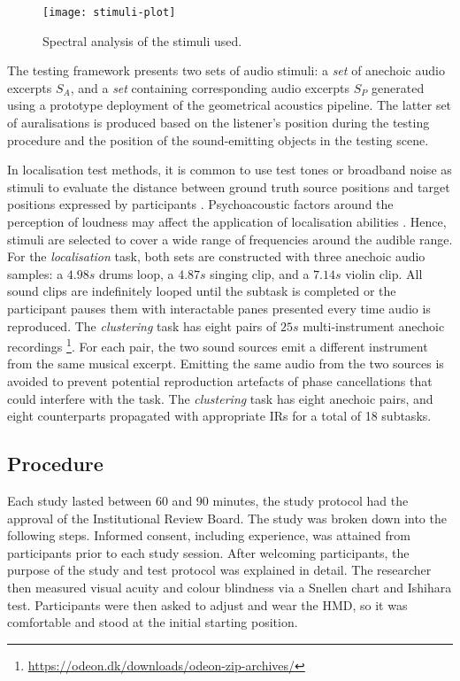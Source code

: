 \begin{figure}[htbp]
    \centering
    \texttt{[image: stimuli-plot]}
    \caption{Spectral analysis of the stimuli used.}
    \label{fig:stimuli}
\end{figure}
The testing framework presents two sets of audio stimuli: a \emph{set} of anechoic audio excerpts $S_A$, and a \emph{set} containing corresponding audio excerpts $S_P$ generated using a prototype deployment of the geometrical acoustics pipeline. The latter set of auralisations is produced based on the listener's position during the testing procedure and the position of the sound-emitting objects in the testing scene. \par
In localisation test methods, it is common to use test tones or broadband noise as stimuli to evaluate the distance between ground truth source positions and target positions expressed by participants \citep{bertet2013investigation, kashino1998adaptation}. Psychoacoustic factors around the perception of loudness may affect the application of localisation abilities \citep{blauert1997spatial}. Hence, stimuli are selected to cover a wide range of frequencies around the audible range.
For the \emph{localisation} task, both sets are constructed with three anechoic audio samples: a $4.98s$ drums loop, a $4.87s$ singing clip, and a $7.14s$ violin clip. All sound clips are indefinitely looped until the subtask is completed or the participant pauses them with interactable panes presented every time audio is reproduced.
The \emph{clustering} task has eight pairs of $25s$ multi-instrument anechoic recordings \footnote{\url{https://odeon.dk/downloads/odeon-zip-archives/}}. For each pair, the two sound sources emit a different instrument from the same musical excerpt. Emitting the same audio from the two sources is avoided to prevent potential reproduction artefacts of phase cancellations that could interfere with the task. The \emph{clustering} task has eight anechoic pairs, and eight counterparts propagated with appropriate IRs for a total of 18 subtasks.

\subsection{Procedure}\label{sec:psy-procedure}
Each study lasted between 60 and 90 minutes, the study protocol had the approval of the Institutional Review Board. The study was broken down into the following steps. Informed consent, including experience, was attained from participants prior to each study session. After welcoming participants, the purpose of the study and test protocol was explained in detail. The researcher then measured visual acuity and colour blindness via a Snellen chart and Ishihara test. Participants were then asked to adjust and wear the HMD, so it was comfortable and stood at the initial starting position. 

